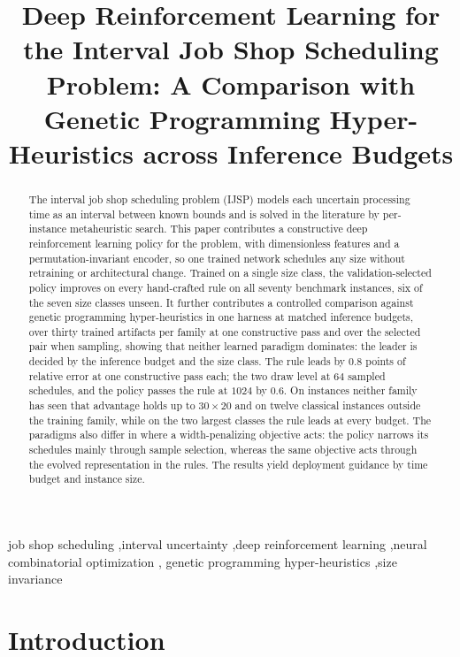 \documentclass[preprint,authoryear,12pt]{elsarticle}
\theoremstyle{definition}
\theoremstyle{remark}
\begin{document}
\begin{frontmatter}

\title{Deep Reinforcement Learning for the Interval Job Shop
Scheduling Problem: A Comparison with Genetic Programming
Hyper-Heuristics across Inference Budgets}


\begin{abstract}
The interval job shop scheduling problem (IJSP) models each uncertain
processing time as an interval between known bounds and is solved in
the literature by per-instance metaheuristic search. This paper
contributes a constructive deep reinforcement learning policy for the
problem, with dimensionless features and a permutation-invariant
encoder, so one trained network schedules any size
without retraining or architectural change. Trained on a single
size class, the validation-selected policy improves on every
hand-crafted rule on all seventy benchmark instances, six
of the seven size classes unseen. It further contributes a
controlled comparison against genetic programming hyper-heuristics in
one harness at matched inference budgets, over thirty trained
artifacts per family at one constructive pass and over the selected
pair when sampling, showing that neither learned
paradigm dominates: the leader is decided by the inference budget and
the size class. The rule leads by $0.8$ points of relative error at one
constructive pass each; the two draw level at $64$ sampled schedules,
and the policy passes the rule at $1024$ by $0.6$. On instances
neither family has seen that advantage holds up to $30{\times}20$ and
on twelve classical instances outside the training family, while on
the two largest classes the rule leads at every budget. The paradigms
also differ in where a width-penalizing objective acts: the policy
narrows its schedules mainly through sample selection, whereas the
same objective acts through the evolved representation in the rules.
The results yield deployment guidance by time budget and instance size.
\end{abstract}

\begin{keyword}
job shop scheduling \sep interval uncertainty \sep deep
reinforcement learning \sep neural combinatorial optimization \sep
genetic programming hyper-heuristics \sep size invariance
\end{keyword}

\end{frontmatter}

\section{Introduction}
\label{sec:intro}
\end{document}
